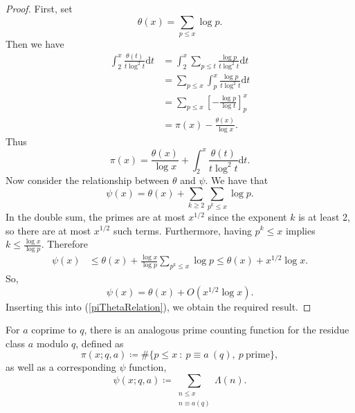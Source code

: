 \begin{proof}
First, set 
\begin{equation}
\theta(x) = \sum_{p \leq x} \log p. \nonumber
\end{equation}
Then we have
\begin{align}
\int_{2}^{x} \frac{\theta(t)}{t \log^{2} t} \mathrm{d} t &= \int_{2}^{x} \sum_{p \leq t} \frac{\log p}{t \log^{2} t} \mathrm{d} t \nonumber \\
&= \sum_{p \leq x} \int_{p}^{x}  \frac{\log p}{t \log^{2} t} \mathrm{d} t \nonumber \\
&= \sum_{p \leq x} \left[-\frac{\log p}{\log t} \right]_{p}^{x} \nonumber \\
&= \pi(x) - \frac{\theta(x)}{\log x}. \nonumber
\end{align}
Thus 
\begin{equation}
\label{piThetaRelation}
\pi(x) = \frac{\theta(x)}{\log x} + \int_{2}^{x} \frac{\theta(t)}{t \log^{2} t} \mathrm{d} t.
\end{equation}
Now consider the relationship between $\theta$ and $\psi$. We have that
\begin{equation}
\psi(x) = \theta(x) + \sum_{k \geq 2}\sum_{p^{k} \leq x} \log p. \nonumber
\end{equation}
In the double sum, the primes are at most $x^{1/2}$ since the exponent $k$ is at least 2, so there are at most $x^{1/2}$ such terms. Furthermore, having $p^{k} \leq x$ implies $k \leq \frac{\log x}{\log p}$. Therefore
\begin{align}
\psi(x) &\leq \theta(x) + \frac{\log x}{\log p} \sum_{p^{k} \leq x} \log p \leq \theta(x) + x^{1/2} \log x. \nonumber
\end{align}
So,
\begin{equation}
\psi(x) = \theta(x) + O\left(x^{1/2} \log x \right). \nonumber
\end{equation}
Inserting this into (\ref{piThetaRelation}), we obtain the required result.
\end{proof}
For $a$ coprime to $q$, there is an analogous prime counting function for the residue class $a$ modulo $q$, defined as 
\begin{equation}
    \pi(x; q, a) \coloneqq \# \{p \leq x \ : \ p \equiv a \ (q), \ p \ \textrm{prime} \}, \nonumber
\end{equation}
as well as a corresponding $\psi$ function,
\begin{equation}
    \psi(x; q, a) \coloneqq \sum_{\substack{n \leq x \\ n \equiv a (q)}} \Lambda(n). \nonumber
\end{equation}

